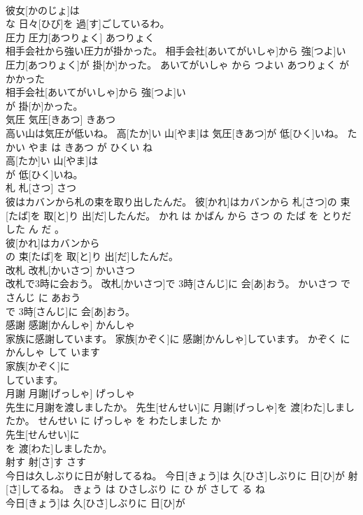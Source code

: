 \documentclass[8pt]{extreport}
\begin{document}
\begin{CJK}{UTF8}{min}
\\	彼女[かのじょ]は
\\	な 日々[ひび]を 過[す]ごしているわ。			
\\	圧力	圧力[あつりょく]	あつりょく	
\\	相手会社から強い圧力が掛かった。	相手会社[あいてがいしゃ]から 強[つよ]い 圧力[あつりょく]が 掛[か]かった。	あいてがいしゃ から つよい あつりょく が かかった	
\\	相手会社[あいてがいしゃ]から 強[つよ]い
\\	が 掛[か]かった。			
\\	気圧	気圧[きあつ]	きあつ	
\\	高い山は気圧が低いね。	高[たか]い 山[やま]は 気圧[きあつ]が 低[ひく]いね。	たかい やま は きあつ が ひくい ね	
\\	高[たか]い 山[やま]は
\\	が 低[ひく]いね。			
\\	札	札[さつ]	さつ	
\\	彼はカバンから札の束を取り出したんだ。	彼[かれ]はカバンから 札[さつ]の 束[たば]を 取[と]り 出[だ]したんだ。	かれ は かばん から さつ の たば を とりだした ん だ 。	
\\	彼[かれ]はカバンから
\\	の 束[たば]を 取[と]り 出[だ]したんだ。			
\\	改札	改札[かいさつ]	かいさつ	
\\	改札で3時に会おう。	改札[かいさつ]で 3時[さんじ]に 会[あ]おう。	かいさつ で さんじ に あおう	
\\	で 3時[さんじ]に 会[あ]おう。			
\\	感謝	感謝[かんしゃ]	かんしゃ	
\\	家族に感謝しています。	家族[かぞく]に 感謝[かんしゃ]しています。	かぞく に かんしゃ して います	
\\	家族[かぞく]に
\\	しています。			
\\	月謝	月謝[げっしゃ]	げっしゃ	
\\	先生に月謝を渡しましたか。	先生[せんせい]に 月謝[げっしゃ]を 渡[わた]しましたか。	せんせい に げっしゃ を わたしました か	
\\	先生[せんせい]に
\\	を 渡[わた]しましたか。			
\\	射す	射[さ]す	さす	
\\	今日は久しぶりに日が射してるね。	今日[きょう]は 久[ひさ]しぶりに 日[ひ]が 射[さ]してるね。	きょう は ひさしぶり に ひ が さして る ね	
\\	今日[きょう]は 久[ひさ]しぶりに 日[ひ]が

\end{CJK}
\end{document}
